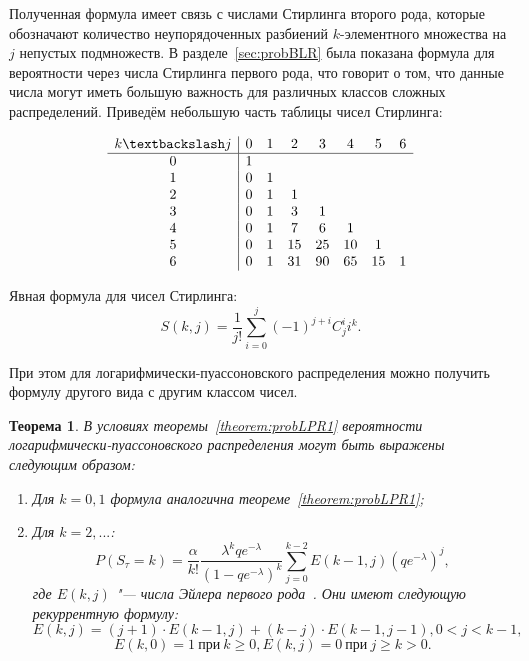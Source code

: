 \documentclass[12pt, specialist, subf, substylefile = spbu_report.rtx]{disser}
\newtheorem{theorem}{Теорема}
\begin{document}
	Полученная формула имеет связь с числами Стирлинга второго рода, которые обозначают количество неупорядоченных разбиений $k$-элементного множества на $j$ непустых подмножеств. В разделе~\ref{sec:probBLR} была показана формула для вероятности через числа Стирлинга первого рода, что говорит о том, что данные числа могут иметь большую важность для различных классов сложных распределений. Приведём небольшую часть таблицы чисел Стирлинга:
	\begin{center}
		\[
		\begin{array}{c|cccccccc}
			k\textbackslash j & 0 & 1 & 2 & 3 & 4 & 5 & 6\\ \hline
			0 & 1 &   &  &  & &  &\\
			1 & 0 & 1 &  &  & &  &\\
			2 & 0 & 1 & 1 &  & &  &\\
			3 & 0 & 1 & 3 & 1 &  & &\\
			4 & 0 & 1 & 7 &  6 & 1 & & \\
			5 & 0 & 1 & 15 & 25 &10 &1 & \\
			6 & 0 & 1 & 31 & 90 & 65 & 15 & 1
		\end{array}
		\]
	\end{center}
	
	Явная формула для чисел Стирлинга:
	\[
	S(k, j) = \frac {1} {j!} \sum \limits _{i = 0} ^j (-1) ^{j + i} C _{j} ^{i} i ^k.
	\]
	
	При этом для логарифмически-пуассоновского распределения можно получить формулу другого вида с другим классом чисел.
	
	\begin{theorem}
		\label{theorem:probLPR2}
		В условиях теоремы~\ref{theorem:probLPR1} вероятности логарифмически-пуассоновского распределения могут быть выражены следующим образом:
		\begin{enumerate}
			\item Для $k = 0, 1$ формула аналогична теореме~\ref{theorem:probLPR1};
			
			\item Для $k = 2, ...$:
			\begin{equation}\label{lpr:prob2}
				P(S _\tau = k) = \frac \alpha {k !} \frac {\lambda ^k q e ^{-\lambda}} {\left(1 - q e ^{-\lambda}\right) ^k} \sum \limits _{j = 0} ^{k - 2} E(k - 1, j) \left(q e ^{-\lambda}\right) ^j, 
			\end{equation}
			где $E(k, j)$ "--- числа Эйлера первого рода~\cite{bib:knuth1998}. Они имеют следующую рекуррентную формулу:
			\[
				E(k, j) = (j + 1) \cdot E(k - 1, j) + (k - j) \cdot E(k - 1, j - 1), 0 < j < k - 1,
			\]
			\[
				E(k, 0) = 1~ \text{при}~ k \geqslant 0, E(k, j) = 0~ \text{при}~ j \geqslant k > 0.
			\]
		\end{enumerate}
	\end{theorem}
	
\end{document}
